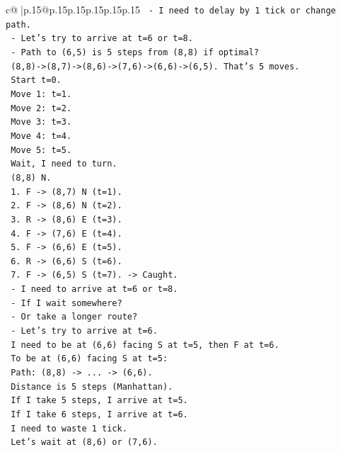 \documentclass{article}
\begin{document}
{\begin{supertabular}{c@{$\;$}|p{.15\linewidth}@{}p{.15\linewidth}p{.15\linewidth}p{.15\linewidth}p{.15\linewidth}p{.15\linewidth}}
{{{\texttt{   {-} I need to delay by 1 tick or change path.} \\
\texttt{   {-} Let's try to arrive at t=6 or t=8.} \\
\texttt{   {-} Path to (6,5) is 5 steps from (8,8) if optimal?} \\
\texttt{     (8,8){-}>(8,7){-}>(8,6){-}>(7,6){-}>(6,6){-}>(6,5). That's 5 moves.} \\
\texttt{     Start t=0.} \\
\texttt{     Move 1: t=1.} \\
\texttt{     Move 2: t=2.} \\
\texttt{     Move 3: t=3.} \\
\texttt{     Move 4: t=4.} \\
\texttt{     Move 5: t=5.} \\
\texttt{     Wait, I need to turn.} \\
\texttt{     (8,8) N.} \\
\texttt{     1. F {-}> (8,7) N (t=1).} \\
\texttt{     2. F {-}> (8,6) N (t=2).} \\
\texttt{     3. R {-}> (8,6) E (t=3).} \\
\texttt{     4. F {-}> (7,6) E (t=4).} \\
\texttt{     5. F {-}> (6,6) E (t=5).} \\
\texttt{     6. R {-}> (6,6) S (t=6).} \\
\texttt{     7. F {-}> (6,5) S (t=7). {-}> Caught.} \\
\texttt{   {-} I need to arrive at t=6 or t=8.} \\
\texttt{   {-} If I wait somewhere?} \\
\texttt{   {-} Or take a longer route?} \\
\texttt{   {-} Let's try to arrive at t=6.} \\
\texttt{     I need to be at (6,6) facing S at t=5, then F at t=6.} \\
\texttt{     To be at (6,6) facing S at t=5:} \\
\texttt{     Path: (8,8) {-}> ... {-}> (6,6).} \\
\texttt{     Distance is 5 steps (Manhattan).} \\
\texttt{     If I take 5 steps, I arrive at t=5.} \\
\texttt{     If I take 6 steps, I arrive at t=6.} \\
\texttt{     I need to waste 1 tick.} \\
\texttt{     Let's wait at (8,6) or (7,6).} \\
}}}
\end{supertabular}}
\end{document}
